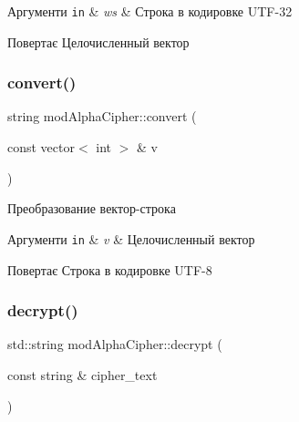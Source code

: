 \begin{DoxyParams}[1]{Аргументи}
\mbox{\tt in}  & {\em ws} & Строка в кодировке U\+T\+F-\/32 \\
\hline
\end{DoxyParams}
\begin{DoxyReturn}{Повертає}
Целочисленный вектор 
\end{DoxyReturn}
\mbox{\label{classmodAlphaCipher_a0c204ef4200fbdd11e2e7f8a3018b396}} 
\subsubsection{\texorpdfstring{convert()}{convert()}\hspace{0.1cm}{\footnotesize\ttfamily [2/2]}}
{\footnotesize\ttfamily string mod\+Alpha\+Cipher\+::convert (\begin{DoxyParamCaption}\item[{const vector$<$ int $>$ \&}]{v }\end{DoxyParamCaption})\hspace{0.3cm}{\ttfamily [private]}}



Преобразование вектор-\/строка 


\begin{DoxyParams}[1]{Аргументи}
\mbox{\tt in}  & {\em v} & Целочисленный вектор \\
\hline
\end{DoxyParams}
\begin{DoxyReturn}{Повертає}
Строка в кодировке U\+T\+F-\/8 
\end{DoxyReturn}
\mbox{\label{classmodAlphaCipher_ad79b06b2d0df98964b9d86283adf9513}} 
\subsubsection{\texorpdfstring{decrypt()}{decrypt()}}
{\footnotesize\ttfamily std\+::string mod\+Alpha\+Cipher\+::decrypt (\begin{DoxyParamCaption}\item[{const string \&}]{cipher\+\_\+text }\end{DoxyParamCaption})}



